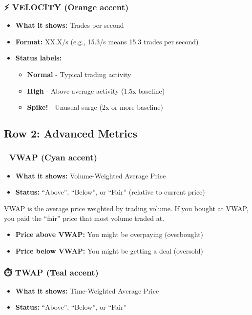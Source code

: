 \documentclass[12pt,a4paper]{article}
\begin{document}
\subsubsection{⚡ VELOCITY (Orange accent)}
\begin{itemize}
    \item \textbf{What it shows:} Trades per second
    \item \textbf{Format:} XX.X/s (e.g., 15.3/s means 15.3 trades per second)
    \item \textbf{Status labels:}
    \begin{itemize}
        \item \textbf{Normal} - Typical trading activity
        \item \textbf{High} - Above average activity (1.5x baseline)
        \item \textbf{Spike!} - Unusual surge (2x or more baseline)
    \end{itemize}
\end{itemize}

\subsection{Row 2: Advanced Metrics}

\subsubsection{📌 VWAP (Cyan accent)}
\begin{itemize}
    \item \textbf{What it shows:} Volume-Weighted Average Price
    \item \textbf{Status:} ``Above'', ``Below'', or ``Fair'' (relative to current price)
\end{itemize}

\begin{importantbox}
VWAP is the average price weighted by trading volume. If you bought at VWAP, you paid the ``fair'' price that most volume traded at. 
\begin{itemize}
    \item \textbf{Price above VWAP:} You might be overpaying (overbought)
    \item \textbf{Price below VWAP:} You might be getting a deal (oversold)
\end{itemize}
\end{importantbox}

\subsubsection{⏱️ TWAP (Teal accent)}
\begin{itemize}
    \item \textbf{What it shows:} Time-Weighted Average Price
    \item \textbf{Status:} ``Above'', ``Below'', or ``Fair''
\end{itemize}
\end{document}

